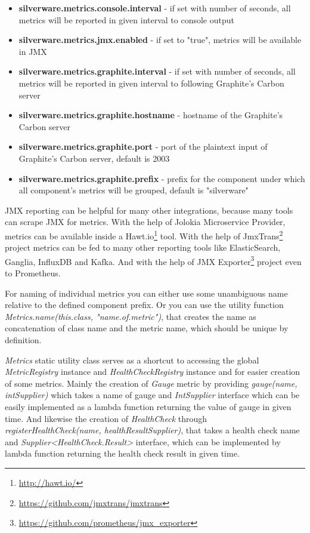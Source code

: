 \documentclass[12pt,oneside]{fithesis2}
\begin{document}
\begin{itemize}
\item \textbf{silverware.metrics.console.interval} - if set with number of seconds, all metrics will be reported in given interval to console output
\item \textbf{silverware.metrics.jmx.enabled} - if set to "true", metrics will be available in JMX
\item \textbf{silverware.metrics.graphite.interval} - if set with number of seconds, all metrics will be reported in given interval to following Graphite's Carbon server
\item \textbf{silverware.metrics.graphite.hostname} - hostname of the Graphite's Carbon server
\item \textbf{silverware.metrics.graphite.port} - port of the plaintext input of Graphite's Carbon server, default is 2003
\item \textbf{silverware.metrics.graphite.prefix} - prefix for the component under which all component's metrics will be grouped, default is "silverware"
\end{itemize}

JMX reporting can be helpful for many other integrations, because many tools can scrape JMX for metrics. With the help of Jolokia Microservice Provider, metrics can be available inside a Hawt.io\footnote{\url{http://hawt.io/}} tool. With the help of JmxTrans\footnote{\url{https://github.com/jmxtrans/jmxtrans}} project metrics can be fed to many other reporting tools like ElasticSearch, Ganglia, InfluxDB and Kafka. And with the help of JMX Exporter\footnote{\url{https://github.com/prometheus/jmx_exporter}} project even to Prometheus.

For naming of individual metrics you can either use some unambiguous name relative to the defined component prefix. Or you can use the utility function \textit{Metrics.name(this.class, "name.of.metric")}, that creates the name as concatenation of class name and the metric name, which should be unique by definition.

\textit{Metrics} static utility class serves as a shortcut to accessing the global \textit{MetricRegistry} instance and \textit{HealthCheckRegistry} instance and for easier creation of some metrics. Mainly the creation of \textit{Gauge} metric by providing \textit{gauge(name, intSupplier)} which takes a name of gauge and \textit{IntSupplier} interface which can be easily implemented as a lambda function returning the value of gauge in given time. And likewise the creation of \textit{HealthCheck} through \textit{registerHealthCheck(name, healthResultSupplier)}, that takes a health check name and \textit{Supplier<HealthCheck.Result>} interface, which can be implemented by lambda function returning the health check result in given time.
\end{document}
